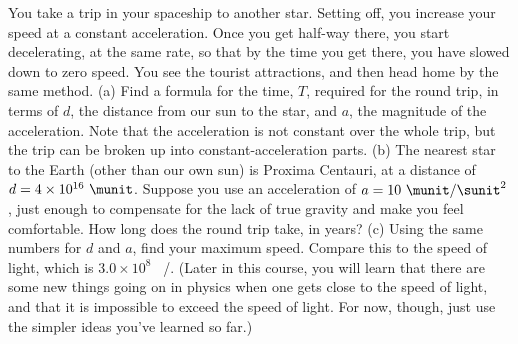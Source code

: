  You take a trip in your spaceship to another star.
Setting off, you increase your speed at a constant
acceleration. Once you get half-way there, you start
decelerating, at the same rate, so that by the time you get
there, you have slowed down to zero speed. You see the
tourist attractions, and then head home by the same method.\hwendpart
(a) Find a formula for the time, $T$, required for the round
trip, in terms of $d$, the distance from our sun to the
star, and $a$, the magnitude of the acceleration. Note that
the acceleration is not constant over the whole trip, but
the trip can be broken up into constant-acceleration parts.\hwendpart
(b) The nearest star to the Earth (other than our own sun)
is Proxima Centauri, at a distance of $d=4\times10^{16}\ \munit$.
Suppose you use an acceleration of $a=10\ \munit/\sunit^2$, just enough
to compensate for the lack of true gravity and make you feel
comfortable. How long does the round trip take, in years?\hwendpart
(c) Using the same numbers for $d$ and $a$, find your
maximum speed. Compare this to the speed of light, which is
$3.0\times10^8$  \ \munit/\sunit. (Later in this course, you will learn
that there are some new things going on in physics when one
gets close to the speed of light, and that it is impossible
to exceed the speed of light. For now, though, just use the
simpler ideas you've learned so far.) \answercheck
